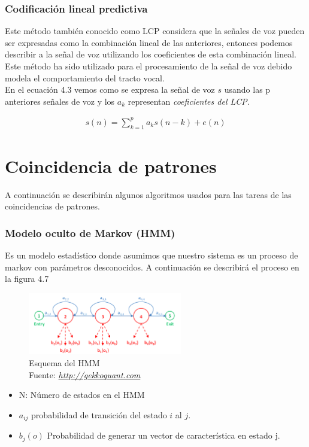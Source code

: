 \subsubsection{Codificación lineal predictiva} 
Este método también conocido como LCP considera que la señales de voz pueden ser expresadas como la combinación lineal de las anteriores, entonces podemos describir a la señal de voz utilizando los coeficientes de esta combinación lineal. Este método ha sido utilizado para el procesamiento de la señal de voz debido modela el comportamiento del tracto vocal.\\ En el ecuación 4.3 vemos como se expresa la señal de voz $s$ usando las p anteriores señales de voz y los $a_{k}$ representan \textit{coeficientes del LCP.}

\begin{equation}
\label{LPC}
\begin{aligned}
s(n)= \sum_{k=1}^{p}a_{k}s(n-k)+e(n)
\end{aligned}
\end{equation}



\section{Coincidencia de patrones}
A continuación se describirán algunos algoritmos usados para las tareas de las coincidencias de patrones.

\subsubsection{Modelo oculto de Markov (HMM)}
Es un modelo estadístico donde asumimos que nuestro sistema es un proceso de markov con parámetros desconocidos. A continuación se describirá el proceso en la figura 4.7

\begin{figure}[H]
	\centering
	\includegraphics[width=0.6\textwidth]{Figures/hmm}
	\caption{Esquema del HMM\\ Fuente:  \href{http://gekkoquant.com/2014/05/18/hidden-markov-models-model-description-part-1-of-4/}{\textit{http://gekkoquant.com}}}
	\label{}
\end{figure} 
\begin{itemize}
	\item N: Número de estados en el HMM
	\item $a_{ij}$ probabilidad de transición del estado $i$ al $j$.
	\item $	b_{j}(o)$ Probabilidad de generar un vector de característica en estado j.
	
\end{itemize}
